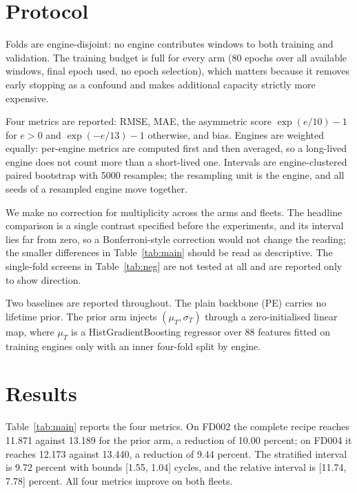 \documentclass[journal]{IEEEtran}
\begin{document}
\section{Protocol}\label{sec:protocol}

Folds are engine-disjoint: no engine contributes windows to both training and validation. The training budget is full for every arm (80 epochs over all available windows, final epoch used, no epoch selection), which matters because it removes early stopping as a confound and makes additional capacity strictly more expensive.

Four metrics are reported: RMSE, MAE, the asymmetric score $\exp(e/10)-1$ for $e>0$ and $\exp(-e/13)-1$ otherwise, and bias. Engines are weighted equally: per-engine metrics are computed first and then averaged, so a long-lived engine does not count more than a short-lived one. Intervals are engine-clustered paired bootstrap with 5000 resamples; the resampling unit is the engine, and all seeds of a resampled engine move together.

We make no correction for multiplicity across the arms and fleets. The headline comparison is a single contrast specified before the experiments, and its interval lies far from zero, so a Bonferroni-style correction would not change the reading; the smaller differences in Table~\ref{tab:main} should be read as descriptive. The single-fold screens in Table~\ref{tab:neg} are not tested at all and are reported only to show direction.

Two baselines are reported throughout. The plain backbone (PE) carries no lifetime prior. The prior arm injects $(\mu_T,\sigma_T)$ through a zero-initialised linear map, where $\mu_T$ is a HistGradientBoosting regressor over 88 features fitted on training engines only with an inner four-fold split by engine.

\section{Results}\label{sec:results}



Table~\ref{tab:main} reports the four metrics. On FD002 the complete recipe reaches 11.871 against 13.189 for the prior arm, a reduction of 10.00 percent; on FD004 it reaches 12.173 against 13.440, a reduction of 9.44 percent. The stratified interval is 9.72 percent with bounds [1.55, 1.04] cycles, and the relative interval is [11.74, 7.78] percent. All four metrics improve on both fleets.
\end{document}
